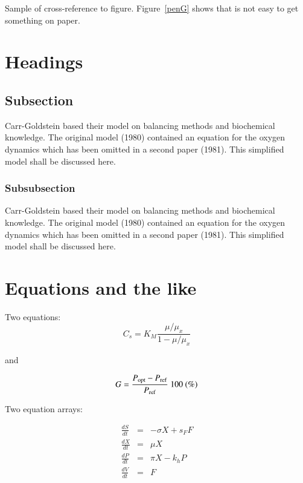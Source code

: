 \documentclass[fist]{svjour3}
\begin{document}
Sample of cross-reference to figure.
Figure~\ref{penG} shows that is not easy to get something on paper.



\section{Headings}

\subsection{Subsection}
Carr-Goldstein based their model on balancing methods and
biochemical know\-ledge. The original model (1980) contained an equation for the
oxygen dynamics which has been omitted in a second paper
(1981). This simplified model shall be discussed here.

\subsubsection{Subsubsection}
Carr-Goldstein
based their model on balancing methods and
biochemical know\-ledge. The original model (1980) contained an equation for the
oxygen dynamics which has been omitted in a second paper
(1981). This simplified model shall be discussed here.

\section{Equations and the like}

Two equations:
\begin{equation}
    C_{s}  =  K_{M} \frac{\mu/\mu_{x}}{1-\mu/\mu_{x}} \label{ccs}
\end{equation}

\noindent
and

\begin{equation}
    G = \frac{P_{\rm opt} - P_{\rm ref}}{P_{\rm ref}} \mbox{\ }100 \mbox{\ }(\%)
\end{equation}

Two equation arrays:

\begin{eqnarray}
  \frac{dS}{dt} & = & - \sigma X + s_{F} F\\
  \frac{dX}{dt} & = &   \mu    X\\
  \frac{dP}{dt} & = &   \pi    X - k_{h} P\\
  \frac{dV}{dt} & = &   F
\end{eqnarray}
\end{document}
